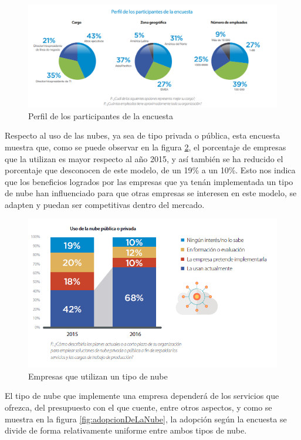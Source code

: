 \documentclass[a4paper, 12pt]{report}
\begin{document}
\begin{justify}
\begin{figure}[ht]
	\begin{center}
		\includegraphics[width=.8\textwidth]{perfilEncuesta}
		\caption{Perfil de los participantes de la encuesta}
		\label{fig:perfilEncuesta}
	\end{center}
\end{figure}

Respecto al uso de las nubes, ya sea de tipo privada o p\'ublica, esta encuesta muestra que, como se puede observar en la figura \ref{fig:empresasYNubes}, el porcentaje de empresas que la utilizan es mayor respecto al año 2015, y así también se ha reducido el porcentaje que desconocen de este modelo, de un 19\% a un 10\%.  Esto nos indica que los beneficios logrados por las empresas que ya ten\'an implementada un tipo de nube han influenciado para que otras empresas se interesen en este modelo, se adapten y puedan ser competitivas dentro del mercado.\par

\begin{figure}[ht]
	\begin{center}
		\includegraphics[width=.8\textwidth]{empresasYNubes}
		\caption{Empresas que utilizan un tipo de nube}
		\label{fig:empresasYNubes}
	\end{center}
\end{figure}

El tipo de nube que implemente una empresa depender\'a de los servicios que ofrezca, del presupuesto con el que cuente, entre otros aspectos, y como se muestra en la figura \ref{fig:adopcionDeLaNube}, la adopci\'on seg\'un la encuesta se divide de forma relativamente uniforme entre ambos tipos de nube.\par


\end{justify}
\end{document}
